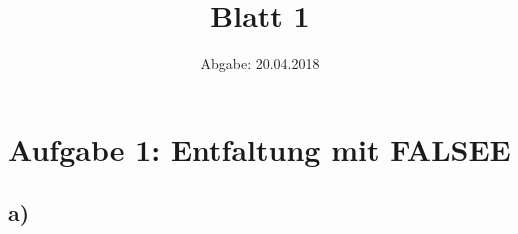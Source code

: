 

\title{Blatt 1}
\date{
  Abgabe: 20.04.2018
}



\maketitle

\section*{Aufgabe 1: Entfaltung mit FALSEE}
\subsection*{a)}

